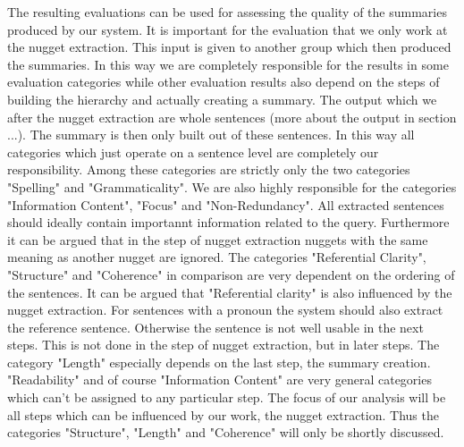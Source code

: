 The resulting evaluations can be used for assessing the quality of the summaries produced by our system. It is important for the evaluation that we only work at the nugget extraction. This input is given to another group which then produced the summaries. In this way we are completely responsible for the results in some evaluation categories while other evaluation results also depend on the steps of  building the hierarchy and actually creating a summary. The output which we after the nugget extraction are whole sentences (more about the output in section ...). The summary is then only built out of these sentences. In this way all categories which just operate on a sentence level are completely our responsibility. Among these categories are strictly only the two categories "Spelling" and "Grammaticality". We are also highly responsible for the categories "Information Content", "Focus" and "Non-Redundancy". All extracted sentences should ideally contain importannt information related to the query. Furthermore it can be argued that in the step of nugget extraction nuggets with the same meaning as another nugget are ignored. The categories "Referential Clarity", "Structure" and "Coherence" in comparison are very dependent on the ordering of the sentences. It can be argued that "Referential clarity" is also influenced by the nugget extraction. For sentences with a pronoun the system should also extract the reference sentence. Otherwise the sentence is not well usable in the next steps. This is not done in the step of nugget extraction, but in later steps. The category "Length" especially depends on the last step, the summary creation. "Readability" and of course "Information Content" are very general categories which can't be assigned to any particular step. The focus of our analysis will be all steps which can be influenced by our work, the nugget extraction. Thus the categories "Structure", "Length" and "Coherence" will only be shortly discussed.

